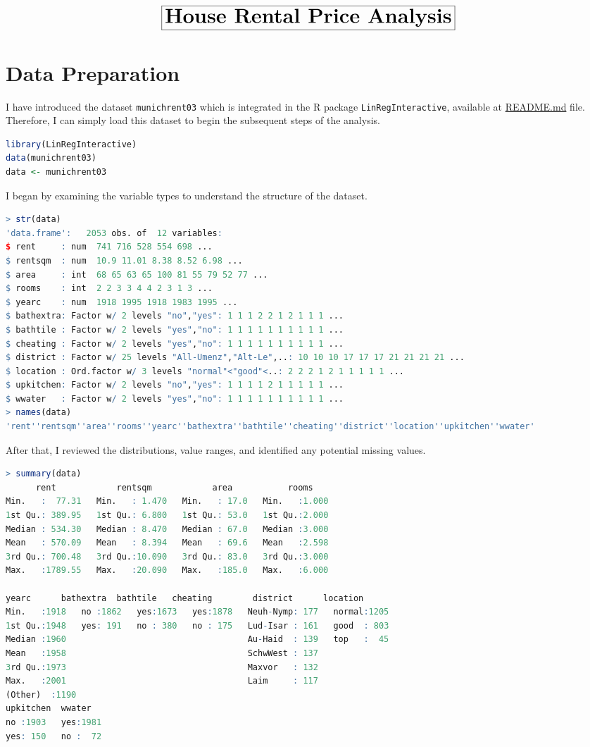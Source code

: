 \documentclass[15pt,a4paper]{report}
\begin{document}
\[
	\boxed{\huge \textbf{House Rental Price Analysis}}
\]
\section*{Data Preparation}
I have introduced the dataset \lstinline[language=R]|munichrent03| which is integrated in the R package \lstinline[language=R]|LinRegInteractive|, available at \href{https://github.com/taitran0102/House-rent-analysis/blob/main/README.md}{README.md} file. Therefore, I can simply load this dataset to begin the subsequent steps of the analysis.
\begin{lstlisting}[language=R]
library(LinRegInteractive)
data(munichrent03)
data <- munichrent03 
\end{lstlisting}
I began by examining the variable types to understand the structure of the dataset. 
\begin{lstlisting}[language=R]
> str(data)
'data.frame':	2053 obs. of  12 variables:
$ rent     : num  741 716 528 554 698 ...
$ rentsqm  : num  10.9 11.01 8.38 8.52 6.98 ...
$ area     : int  68 65 63 65 100 81 55 79 52 77 ...
$ rooms    : int  2 2 3 3 4 4 2 3 1 3 ...
$ yearc    : num  1918 1995 1918 1983 1995 ...
$ bathextra: Factor w/ 2 levels "no","yes": 1 1 1 2 2 1 2 1 1 1 ...
$ bathtile : Factor w/ 2 levels "yes","no": 1 1 1 1 1 1 1 1 1 1 ...
$ cheating : Factor w/ 2 levels "yes","no": 1 1 1 1 1 1 1 1 1 1 ...
$ district : Factor w/ 25 levels "All-Umenz","Alt-Le",..: 10 10 10 17 17 17 21 21 21 21 ...
$ location : Ord.factor w/ 3 levels "normal"<"good"<..: 2 2 2 1 2 1 1 1 1 1 ...
$ upkitchen: Factor w/ 2 levels "no","yes": 1 1 1 1 2 1 1 1 1 1 ...
$ wwater   : Factor w/ 2 levels "yes","no": 1 1 1 1 1 1 1 1 1 1 ...
> names(data)
'rent''rentsqm''area''rooms''yearc''bathextra''bathtile''cheating''district''location''upkitchen''wwater'
\end{lstlisting}
After that, I reviewed the distributions, value ranges, and identified any potential missing values.
\begin{lstlisting}[language=R]
> summary(data)
      rent            rentsqm            area           rooms      
Min.   :  77.31   Min.   : 1.470   Min.   : 17.0   Min.   :1.000  
1st Qu.: 389.95   1st Qu.: 6.800   1st Qu.: 53.0   1st Qu.:2.000  
Median : 534.30   Median : 8.470   Median : 67.0   Median :3.000  
Mean   : 570.09   Mean   : 8.394   Mean   : 69.6   Mean   :2.598  
3rd Qu.: 700.48   3rd Qu.:10.090   3rd Qu.: 83.0   3rd Qu.:3.000  
Max.   :1789.55   Max.   :20.090   Max.   :185.0   Max.   :6.000  

yearc      bathextra  bathtile   cheating        district      location   
Min.   :1918   no :1862   yes:1673   yes:1878   Neuh-Nymp: 177   normal:1205  
1st Qu.:1948   yes: 191   no : 380   no : 175   Lud-Isar : 161   good  : 803  
Median :1960                                    Au-Haid  : 139   top   :  45  
Mean   :1958                                    SchwWest : 137                
3rd Qu.:1973                                    Maxvor   : 132                
Max.   :2001                                    Laim     : 117                
(Other)  :1190                
upkitchen  wwater    
no :1903   yes:1981  
yes: 150   no :  72  

\end{lstlisting}
\end{document}
